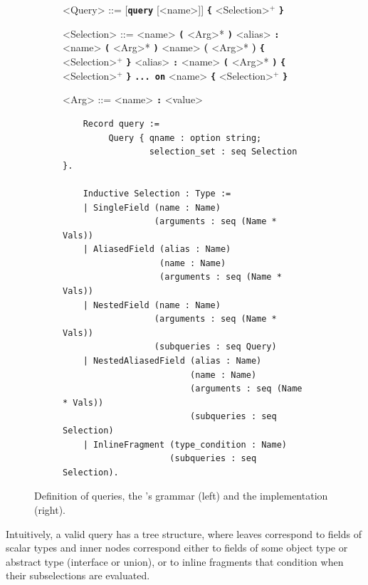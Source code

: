 \begin{figure}[h]
  \centering
  \begin{subfigure}{.5\textwidth}
    \begin{grammar}
    		<Query> ::= [\textbf{\texttt{query}} [<name>]] \textbf{\texttt{\{}} <Selection>$^{+}$ \textbf{\texttt{\}}}
		
        <Selection> ::= <name> \textbf{\texttt{(}} <Arg>* \textbf{\texttt{)}}
        \alt <alias> \textbf{\texttt{:}} <name> \textbf{\texttt{(}} <Arg>* \textbf{\texttt{)}}
        \alt <name> \textbf{(} <Arg>* \textbf{)} \textbf{\texttt{\{}} <Selection>$^{+}$ \textbf{\texttt{\}}}
        \alt <alias> \textbf{\texttt{:}} <name> \textbf{\texttt{(}} <Arg>* \textbf{\texttt{)}} \textbf{\texttt{\{}} <Selection>$^{+}$ \textbf{\texttt{\}}}
        \alt \textbf{\texttt{... on}} <name> \textbf{\texttt{\{}} <Selection>$^{+}$ \textbf{\texttt{\}}}
        
        <Arg> ::= <name> \textbf{\texttt{:}} <value>
    \end{grammar}
  \end{subfigure}%
  \begin{subfigure}{.5\textwidth}

    \begin{verbatim}
    Record query := 
         Query { qname : option string; 
                 selection_set : seq Selection }.
                   
    Inductive Selection : Type :=
    | SingleField (name : Name)
                  (arguments : seq (Name * Vals))
    | AliasedField (alias : Name)
                   (name : Name)
                   (arguments : seq (Name * Vals))
    | NestedField (name : Name)
                  (arguments : seq (Name * Vals))
                  (subqueries : seq Query)
    | NestedAliasedField (alias : Name)
                         (name : Name)
                         (arguments : seq (Name * Vals))
                         (subqueries : seq Selection)
    | InlineFragment (type_condition : Name)
                     (subqueries : seq Selection).
    \end{verbatim}
  \end{subfigure}
  \caption{Definition of \gql queries, the \spec's grammar (left) and the \coq implementation (right).}
  \label{fig:query_def}
\end{figure}

Intuitively, a valid query has a tree structure, where leaves correspond to fields of scalar types and inner nodes correspond either to fields of some object type or abstract type (interface or union), or to inline fragments that condition when their subselections are evaluated. 

